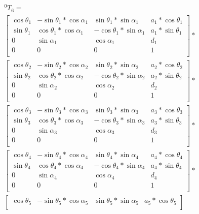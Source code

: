 \begin{multline}\label{eq:TransformMatrices_0-6}
	^0T_6=\\
	\begin{bmatrix}
\cos\theta_1 & -\sin\theta_1*\cos\alpha_1 & \sin\theta_1*\sin\alpha_1 & a_1*\cos\theta_1 \\
\sin\theta_1 & \cos\theta_1*\cos\alpha_1 & -\cos\theta_1*\sin\alpha_1 & a_1*\sin\theta_1 \\
0 & \sin\alpha_1 & \cos\alpha_1 & d_1 \\
0 & 0 & 0 & 1 \\
\end{bmatrix}
*\\
\begin{bmatrix}
\cos\theta_2 & -\sin\theta_2*\cos\alpha_2 & \sin\theta_2*\sin\alpha_2 & a_2*\cos\theta_2 \\
\sin\theta_2 & \cos\theta_2*\cos\alpha_2 & -\cos\theta_2*\sin\alpha_2 & a_2*\sin\theta_2 \\
0 & \sin\alpha_2 & \cos\alpha_2 & d_2 \\
0 & 0 & 0 & 1 \\
\end{bmatrix}
*\\
\begin{bmatrix}
\cos\theta_3 & -\sin\theta_3*\cos\alpha_3 & \sin\theta_3*\sin\alpha_3 & a_3*\cos\theta_3 \\
\sin\theta_3 & \cos\theta_3*\cos\alpha_3 & -\cos\theta_3*\sin\alpha_3 & a_3*\sin\theta_3 \\
0 & \sin\alpha_3 & \cos\alpha_3 & d_3 \\
0 & 0 & 0 & 1 \\
\end{bmatrix}
*\\
\begin{bmatrix}
\cos\theta_4 & -\sin\theta_4*\cos\alpha_4 & \sin\theta_4*\sin\alpha_4 & a_4*\cos\theta_4 \\
\sin\theta_4 & \cos\theta_4*\cos\alpha_4 & -\cos\theta_4*\sin\alpha_4 & a_4*\sin\theta_4 \\
0 & \sin\alpha_4 & \cos\alpha_4 & d_4 \\
0 & 0 & 0 & 1 \\
\end{bmatrix}
*\\
\begin{bmatrix}
\cos\theta_5 & -\sin\theta_5*\cos\alpha_5 & \sin\theta_5*\sin\alpha_5 & a_5*\cos\theta_5 \\

\end{bmatrix}
\end{multline}
